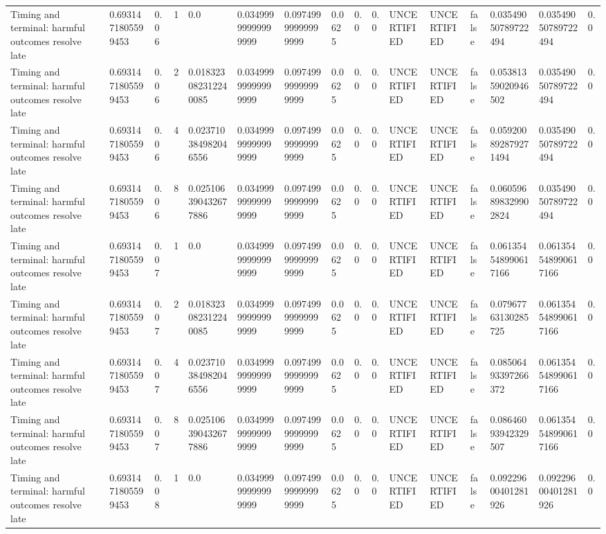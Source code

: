 \begin{tabular}{llllllllllllllll}
Timing and terminal: harmful outcomes resolve late & 0.6931471805599453 & 0.06 & 1 & 0.0 & 0.03499999999999999 & 0.09749999999999999 & 0.0625 & 0.0 & 0.0 & UNCERTIFIED & UNCERTIFIED & false & 0.03549050789722494 & 0.03549050789722494 & 0.0 \\
Timing and terminal: harmful outcomes resolve late & 0.6931471805599453 & 0.06 & 2 & 0.018323082312240085 & 0.03499999999999999 & 0.09749999999999999 & 0.0625 & 0.0 & 0.0 & UNCERTIFIED & UNCERTIFIED & false & 0.05381359020946502 & 0.03549050789722494 & 0.0 \\
Timing and terminal: harmful outcomes resolve late & 0.6931471805599453 & 0.06 & 4 & 0.023710384982046556 & 0.03499999999999999 & 0.09749999999999999 & 0.0625 & 0.0 & 0.0 & UNCERTIFIED & UNCERTIFIED & false & 0.059200892879271494 & 0.03549050789722494 & 0.0 \\
Timing and terminal: harmful outcomes resolve late & 0.6931471805599453 & 0.06 & 8 & 0.025106390432677886 & 0.03499999999999999 & 0.09749999999999999 & 0.0625 & 0.0 & 0.0 & UNCERTIFIED & UNCERTIFIED & false & 0.060596898329902824 & 0.03549050789722494 & 0.0 \\
Timing and terminal: harmful outcomes resolve late & 0.6931471805599453 & 0.07 & 1 & 0.0 & 0.03499999999999999 & 0.09749999999999999 & 0.0625 & 0.0 & 0.0 & UNCERTIFIED & UNCERTIFIED & false & 0.061354548990617166 & 0.061354548990617166 & 0.0 \\
Timing and terminal: harmful outcomes resolve late & 0.6931471805599453 & 0.07 & 2 & 0.018323082312240085 & 0.03499999999999999 & 0.09749999999999999 & 0.0625 & 0.0 & 0.0 & UNCERTIFIED & UNCERTIFIED & false & 0.07967763130285725 & 0.061354548990617166 & 0.0 \\
Timing and terminal: harmful outcomes resolve late & 0.6931471805599453 & 0.07 & 4 & 0.023710384982046556 & 0.03499999999999999 & 0.09749999999999999 & 0.0625 & 0.0 & 0.0 & UNCERTIFIED & UNCERTIFIED & false & 0.08506493397266372 & 0.061354548990617166 & 0.0 \\
Timing and terminal: harmful outcomes resolve late & 0.6931471805599453 & 0.07 & 8 & 0.025106390432677886 & 0.03499999999999999 & 0.09749999999999999 & 0.0625 & 0.0 & 0.0 & UNCERTIFIED & UNCERTIFIED & false & 0.08646093942329507 & 0.061354548990617166 & 0.0 \\
Timing and terminal: harmful outcomes resolve late & 0.6931471805599453 & 0.08 & 1 & 0.0 & 0.03499999999999999 & 0.09749999999999999 & 0.0625 & 0.0 & 0.0 & UNCERTIFIED & UNCERTIFIED & false & 0.09229600401281926 & 0.09229600401281926 & 0.0 \\

\end{tabular}
